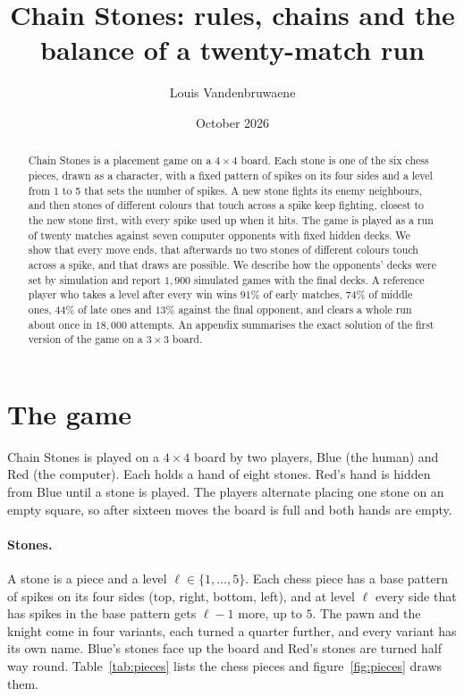 \documentclass[11pt,a4paper]{article}
\title{Chain Stones: rules, chains and the balance of a twenty-match run}
\author{Louis Vandenbruwaene}
\date{October 2026}
\begin{document}
\maketitle

\begin{abstract}
\noindent
Chain Stones is a placement game on a $4\times4$ board. Each stone is one of the six chess pieces, drawn as a character, with a fixed pattern of spikes on its four sides and a level from 1 to 5 that sets the number of spikes. A new stone fights its enemy neighbours, and then stones of different colours that touch across a spike keep fighting, closest to the new stone first, with every spike used up when it hits. The game is played as a run of twenty matches against seven computer opponents with fixed hidden decks. We show that every move ends, that afterwards no two stones of different colours touch across a spike, and that draws are possible. We describe how the opponents' decks were set by simulation and report $1{,}900$ simulated games with the final decks. A reference player who takes a level after every win wins $91\%$ of early matches, $74\%$ of middle ones, $44\%$ of late ones and $13\%$ against the final opponent, and clears a whole run about once in $18{,}000$ attempts. An appendix summarises the exact solution of the first version of the game on a $3\times3$ board.
\end{abstract}

\section{The game}

Chain Stones is played on a $4\times4$ board by two players, Blue (the human) and Red (the computer). Each holds a hand of eight stones. Red's hand is hidden from Blue until a stone is played. The players alternate placing one stone on an empty square, so after sixteen moves the board is full and both hands are empty.

\paragraph{Stones.} A stone is a piece and a level $\ell\in\{1,\dots,5\}$. Each chess piece has a base pattern of spikes on its four sides (top, right, bottom, left), and at level $\ell$ every side that has spikes in the base pattern gets $\ell-1$ more, up to $5$. The pawn and the knight come in four variants, each turned a quarter further, and every variant has its own name. Blue's stones face up the board and Red's stones are turned half way round. Table~\ref{tab:pieces} lists the chess pieces and figure~\ref{fig:pieces} draws them.
\end{document}
